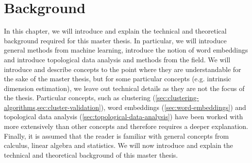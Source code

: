 \chapter{Background}
In this chapter, we will introduce and explain the technical and theoretical background required for this master thesis. In particular, we will introduce general methods from machine learning, introduce the notion of word embeddings and introduce topological data analysis and methods from the field. We will introduce and describe concepts to the point where they are understandable for the sake of the master thesis, but for some particular concepts (e.g. intrinsic dimension estimation), we leave out technical details as they are not the focus of the thesis. Particular concepts, such as clustering (\cref{sec:clustering-algorithms,sec:cluster-validation}), word embeddings (\cref{sec:word-embeddings}) and topological data analysis (\cref{sec:topological-data-analysis}) have been worked with more extensively than other concepts and therefore requires a deeper explanation. Finally, it is assumed that the reader is familiar with general concepts from calculus, linear algebra and statistics. We will now introduce and explain the technical and theoretical background of this master thesis.



